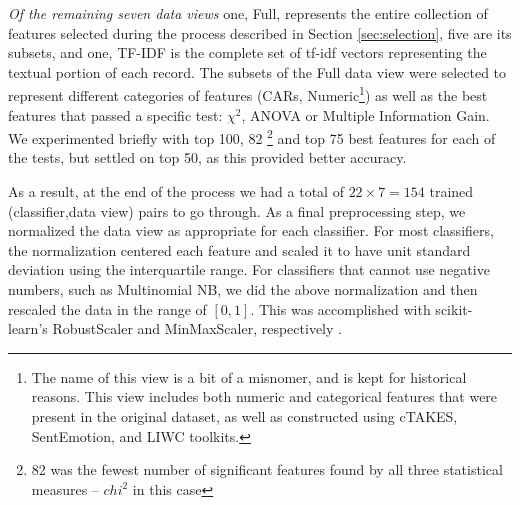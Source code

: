 \textit{Of the remaining seven data views} one, \textsf{Full}, represents 
the entire collection of features selected during
the process described in Section \ref{sec:selection}, five are its subsets,
and one, \textsf{TF-IDF} is the complete set of tf-idf vectors
representing the textual portion of each record. The subsets
of the \textsf{Full} data view were selected to represent different categories
of features (\textsf{CARs}, \textsf{Numeric}\footnote{The name
of this view is a bit of a misnomer, and is kept for historical reasons.
This view includes both numeric and categorical features that
were present in the original dataset, as well as constructed
using \textsf{cTAKES}, SentEmotion, and \textsf{LIWC} toolkits.}) as well
as the best features that passed a specific test: $\chi^2$, ANOVA or Multiple
Information Gain. We experimented briefly with top 100, 82 \footnote{82 was the fewest number of significant features found by all three statistical measures -- $chi^2$ in this case} and top 75 best features
for each of the tests, but settled on top 50, as this provided better accuracy.

As a result, at the end of the process we had a total of $22\times 7 = 154$
trained (classifier,data view) pairs to go through. As a final preprocessing step, we normalized the data view as appropriate for each classifier. For most classifiers, the normalization centered each feature and scaled it to have unit standard deviation using the interquartile range. For classifiers that cannot use negative numbers, such as Multinomial NB, we did the above normalization and then rescaled the data in the range of $[0, 1]$. This was accomplished with \textsf{scikit-learn}'s \textsf{RobustScaler} and \textsf{MinMaxScaler}, respectively \cite{scikit-learn}. 


